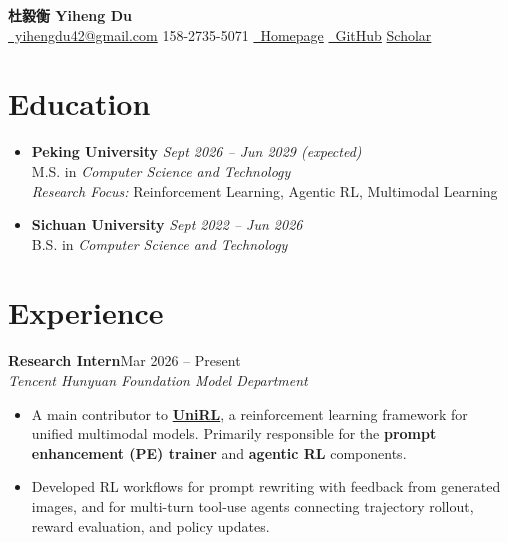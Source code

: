 \documentclass[10pt,a4paper]{article}
\newcommand{\sep}{\hspace{0.6em}{\large$\cdot$}\hspace{0.6em}}
\newcommand{\dateright}[1]{\hfill {\small #1}}
\newcommand{\role}[2]{\textbf{#1}\dateright{#2}}
\newcommand{\org}[1]{\textit{#1}}
\newcommand{\homeicon}{}     %
\newcommand{\githubicon}{}
\newcommand{\mailicon}{}
\begin{document}
{\LARGE \textbf{杜毅衡 \quad Yiheng Du}}\\
\href{mailto:yihengdu42@gmail.com}{\mailicon\ yihengdu42@gmail.com} \sep
158-2735-5071 \sep
\href{https://ideny42.github.io/}{\homeicon\ Homepage} \sep
\href{https://github.com/Ideny42}{\githubicon\ GitHub} \sep
\href{https://scholar.google.com/citations?user=718Y9mMAAAAJ}{Scholar}


\section*{Education}
\begin{itemize}[leftmargin=1.2em, itemsep=4pt, topsep=2pt]
  \item \textbf{Peking University} \hfill \textit{Sept 2026 -- Jun 2029 (expected)}\\
  \hspace*{1.2em} M.S. in \textit{Computer Science and Technology} \\
  \hspace*{1.2em} \textit{Research Focus:} Reinforcement Learning, Agentic RL, Multimodal Learning

  \item \textbf{Sichuan University} \hfill \textit{Sept 2022 -- Jun 2026}\\
  \hspace*{1.2em} B.S. in \textit{Computer Science and Technology} 
\end{itemize}

\section*{Experience}

\role{Research Intern}{Mar 2026 -- Present}\\
\org{Tencent \sep Hunyuan \sep Foundation Model Department}
\begin{itemize}
  \item A main contributor to \href{https://github.com/Tencent-Hunyuan/UniRL}{\textbf{UniRL}}, a reinforcement learning framework for unified multimodal models. Primarily responsible for the \textbf{prompt enhancement (PE) trainer} and \textbf{agentic RL} components.
  \item Developed RL workflows for prompt rewriting with feedback from generated images, and for multi-turn tool-use agents connecting trajectory rollout, reward evaluation, and policy updates.
\end{itemize}
\end{document}
